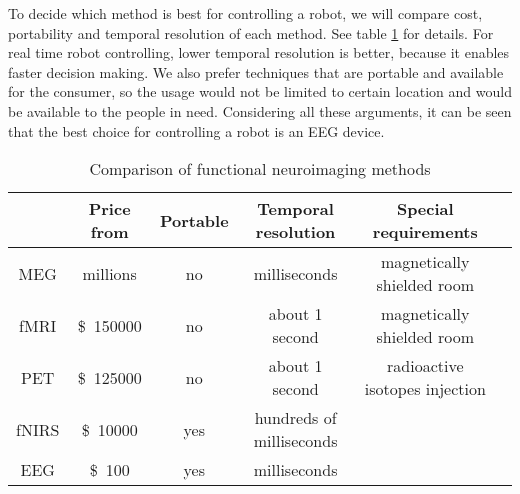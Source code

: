 To decide which method is best for controlling a robot, we will compare cost, portability and temporal resolution of each method. See table \ref{tab:neuroimaging} for details. For real time robot controlling, lower temporal resolution is better, because it enables faster decision making. We also prefer techniques that are portable and available for the consumer, so the usage would not be limited to certain location and would be available to the people in need. Considering all these arguments, it can be seen that the best choice for controlling a robot is an \acrshort{EEG} device.


\newcommand{\pMEG}{\tablefootnote{http://neurogadget.com/2012/12/15/inexpensive-magnetoencephalography-meg-system-could-be-available-at-every-hospital/6495}}
\newcommand{\pfMRI}{\tablefootnote{http://info.blockimaging.com/bid/92623/MRI-Machine-Cost-and-Price-Guide}}
\newcommand{\pPET}{\tablefootnote{http://info.blockimaging.com/bid/68875/How-Much-Does-a-PET-CT-Scanner-Cost}}
\newcommand{\plEEG}{\tablefootnote{http://en.wikipedia.org/wiki/Comparison\_of\_consumer\_brain-computer\_interfaces}}
\newcommand{\phEEG}{\tablefootnote{http://www.brainvision.com/files/actiCHamp-PyCorder-Flyer\_US.pdf}}
\newcommand{\pNIRS}{\cite{NIRS}}
\newcommand{\tresol}{\cite{timeresol}}


\begin{table}[h]
	\centering
	\begin{tabular}{|c|c|c|c|c|c|}
	\hline
				& Price	from				& Portable	& Temporal resolution	& Special requirements		\\\hline
\acrshort{MEG}	& millions\pMEG				& no	& milliseconds \tresol		& magnetically shielded room\\\hline
\acrshort{fMRI}	& \SI{150000}[\$]\pfMRI		& no	& about 1 second \tresol	& magnetically shielded room\\\hline
\acrshort{PET}	& \SI{125000}[\$]\pPET		& no	& about 1 second \tresol	& radioactive isotopes injection\\\hline
\acrshort{fNIRS}& \SI{10000}[\$]{} \pNIRS	& yes	& hundreds of milliseconds \pNIRS&						\\\hline
\acrshort{EEG}	& \SI{100}[\$]\plEEG		& yes	& milliseconds \tresol		&							\\\hline
	\end{tabular}
	\caption{Comparison of functional neuroimaging methods}
	\label{tab:neuroimaging}
\end{table}

